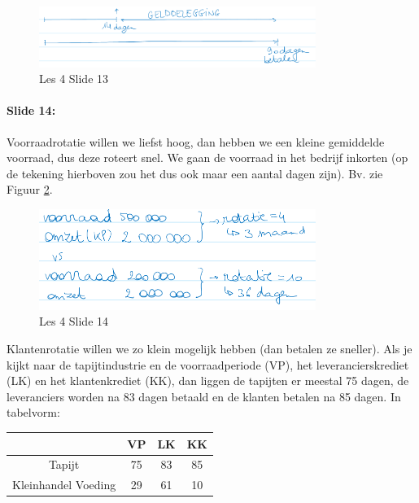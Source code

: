 \documentclass[10pt,a4paper]{report}
\begin{document}
\begin{figure}[h!]
\centering
\includegraphics[width=90mm]{Les04_01.png}
\caption{Les 4 Slide 13} 
\label{les04_01}
\end{figure}

\paragraph{Slide 14:} Voorraadrotatie willen we liefst hoog, dan hebben we een kleine gemiddelde voorraad, dus deze roteert snel. We gaan de voorraad in het bedrijf inkorten (op de tekening hierboven zou het dus ook maar een aantal dagen zijn). Bv. zie Figuur \ref{les04_02}.

\begin{figure}[h!]
\centering
\includegraphics[width=90mm]{Les04_02.png}
\caption{Les 4 Slide 14} 
\label{les04_02}
\end{figure}

Klantenrotatie willen we zo klein mogelijk hebben (dan betalen ze sneller). 
Als je kijkt naar de tapijtindustrie en de voorraadperiode (VP),  het leverancierskrediet (LK) en het klantenkrediet (KK), dan liggen de tapijten er meestal 75 dagen, de leveranciers worden na 83 dagen betaald en de klanten betalen na 85 dagen. In tabelvorm:


\begin{table}[h!]
\centering
\begin{tabular}{|c||c|c|c|}
\hline                         										
		 				&	VP 		&	LK		&	KK		\\	\hline	\hline
Tapijt					&	75		&	83		&	85		\\	\hline
Kleinhandel Voeding		&	29		&	61		&	10		\\	\hline

\end{tabular}
\label{les4_slide14}
\end{table}
\end{document}
